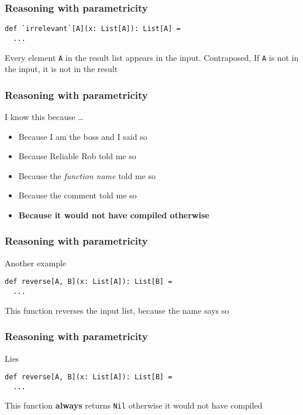 \begin{frame}[fragile]
\frametitle{Reasoning with parametricity}
\begin{lstlisting}[style=scala]
def `irrelevant`[A](x: List[A]): List[A] = 
  ...
\end{lstlisting}
\begin{theorem}Every element \lstinline{A} in the result list appears in the input. Contraposed, If \lstinline{A} is not in the input, it is not in the result\end{theorem}
\end{frame}

\begin{frame}[fragile]
\frametitle{Reasoning with parametricity}
\begin{block}{I know this because \ldots}
\begin{itemize}
  \item<1> Because I am the boss and I said so
  \item<2> Because Reliable Rob told me so
  \item<3> Because the \emph{function name} told me so
  \item<4> Because the comment told me so
  \item<5> \textbf{Because it would not have compiled otherwise}
\end{itemize}
\end{block}
\end{frame}

\begin{frame}[fragile]
\frametitle{Reasoning with parametricity}
\begin{block}{Another example}
\begin{lstlisting}[style=scala]
def reverse[A, B](x: List[A]): List[B] = 
  ...
\end{lstlisting}
\end{block}
\begin{theorem}This function reverses the input list, because the name says so\end{theorem}
\end{frame}

\begin{frame}[fragile]
\frametitle{Reasoning with parametricity}
\begin{block}{Lies}
\begin{lstlisting}[style=scala]
def reverse[A, B](x: List[A]): List[B] = 
  ...
\end{lstlisting}
\end{block}
\begin{theorem}This function \textbf{always} returns \lstinline{Nil} otherwise it would not have compiled\end{theorem}
\end{frame}

